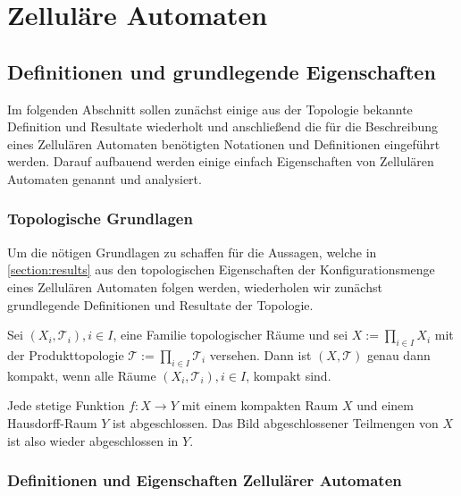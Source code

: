 \chapter{Zelluläre Automaten}
\label{chapter:CAs}


\section{Definitionen und grundlegende Eigenschaften}
\label{section:definitions}

Im folgenden Abschnitt sollen zunächst einige aus der Topologie bekannte Definition und Resultate wiederholt und anschließend die für die Beschreibung eines Zellulären Automaten benötigten Notationen und Definitionen eingeführt werden. Darauf aufbauend werden einige einfach Eigenschaften von Zellulären Automaten genannt und analysiert.

\subsection{Topologische Grundlagen}
\label{subsection:topos}

Um die nötigen Grundlagen zu schaffen für die Aussagen, welche in \ref{section:results} aus den topologischen Eigenschaften der Konfigurationsmenge eines Zellulären Automaten folgen werden, wiederholen wir zunächst grundlegende Definitionen und Resultate der Topologie.

\begin{theorem}[Tychonoff]
  Sei $(X_i, \mathcal{T}_i), i \in I$, eine Familie topologischer Räume und sei $X := \prod_{i \in I} X_i$ mit der Produkttopologie  $\mathcal{T} := \prod_{i \in I} \mathcal{T}_i$ versehen. Dann ist $(X, \mathcal{T})$ genau dann kompakt, wenn alle Räume $(X_i, \mathcal{T}_i), i \in I$, kompakt sind.
\end{theorem}

\begin{theorem}
  Jede stetige Funktion $f: X \to Y$ mit einem kompakten Raum $X$ und einem Hausdorff-Raum $Y$ ist abgeschlossen. Das Bild abgeschlossener Teilmengen von $X$ ist also wieder abgeschlossen in $Y$.
\end{theorem}

\subsection{Definitionen und Eigenschaften Zellulärer Automaten}

